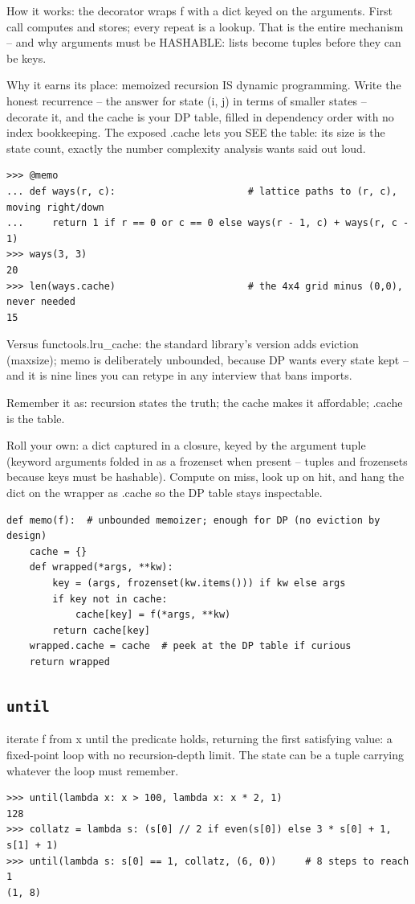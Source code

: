 \documentclass[10pt,letterpaper]{book}
\begin{document}
How it works: the decorator wraps f with a dict keyed on the arguments. First call computes and stores; every repeat is a lookup. That is the entire mechanism -- and why arguments must be HASHABLE: lists become tuples before they can be keys.


Why it earns its place: memoized recursion IS dynamic programming. Write the honest recurrence -- the answer for state (i, j) in terms of smaller states -- decorate it, and the cache is your DP table, filled in dependency order with no index bookkeeping. The exposed .cache lets you SEE the table: its size is the state count, exactly the number complexity analysis wants said out loud.

\begin{lstlisting}[style=ex]
>>> @memo
... def ways(r, c):                       # lattice paths to (r, c), moving right/down
...     return 1 if r == 0 or c == 0 else ways(r - 1, c) + ways(r, c - 1)
>>> ways(3, 3)
20
>>> len(ways.cache)                       # the 4x4 grid minus (0,0), never needed
15
\end{lstlisting}

Versus functools.lru\_cache: the standard library's version adds eviction (maxsize); memo is deliberately unbounded, because DP wants every state kept -- and it is nine lines you can retype in any interview that bans imports.


Remember it as: recursion states the truth; the cache makes it affordable; .cache is the table.


Roll your own: a dict captured in a closure, keyed by the argument tuple (keyword arguments folded in as a frozenset when present -- tuples and frozensets because keys must be hashable). Compute on miss, look up on hit, and hang the dict on the wrapper as .cache so the DP table stays inspectable.

\begin{lstlisting}[style=ex]
def memo(f):  # unbounded memoizer; enough for DP (no eviction by design)
    cache = {}
    def wrapped(*args, **kw):
        key = (args, frozenset(kw.items())) if kw else args
        if key not in cache:
            cache[key] = f(*args, **kw)
        return cache[key]
    wrapped.cache = cache  # peek at the DP table if curious
    return wrapped
\end{lstlisting}
\subsection{\texttt{until}}\label{def:until}
iterate f from x until the predicate holds, returning the first satisfying value: a fixed-point loop with no recursion-depth limit. The state can be a tuple carrying whatever the loop must remember.
\begin{lstlisting}[style=ex]
>>> until(lambda x: x > 100, lambda x: x * 2, 1)
128
>>> collatz = lambda s: (s[0] // 2 if even(s[0]) else 3 * s[0] + 1, s[1] + 1)
>>> until(lambda s: s[0] == 1, collatz, (6, 0))     # 8 steps to reach 1
(1, 8)
\end{lstlisting}
\end{document}
